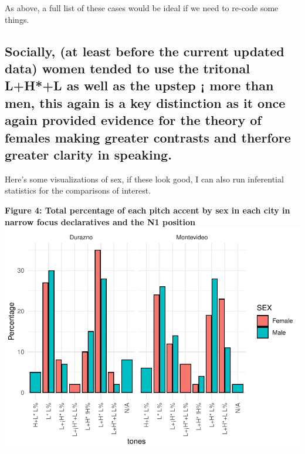 \documentclass[
  man]{apa6}
\begin{document}
As above, a full list of these cases would be ideal if we need to re-code some things.

\hypertarget{socially-at-least-before-the-current-updated-data-women-tended-to-use-the-tritonal-lhl-as-well-as-the-upstep-more-than-men-this-again-is-a-key-distinction-as-it-once-again-provided-evidence-for-the-theory-of-females-making-greater-contrasts-and-therfore-greater-clarity-in-speaking.}{%
\subsection{Socially, (at least before the current updated data) women tended to use the tritonal L+H*+L as well as the upstep ¡ more than men, this again is a key distinction as it once again provided evidence for the theory of females making greater contrasts and therfore greater clarity in speaking.}\label{socially-at-least-before-the-current-updated-data-women-tended-to-use-the-tritonal-lhl-as-well-as-the-upstep-more-than-men-this-again-is-a-key-distinction-as-it-once-again-provided-evidence-for-the-theory-of-females-making-greater-contrasts-and-therfore-greater-clarity-in-speaking.}}

Here's some visualizations of sex, if these look good, I can also run inferential statistics for the comparisons of interest.

\textbf{Figure 4: Total percentage of each pitch accent by sex in each city in narrow focus declaratives and the N1 position}
\includegraphics{main_files/figure-latex/unnamed-chunk-12-1.pdf}
\end{document}
